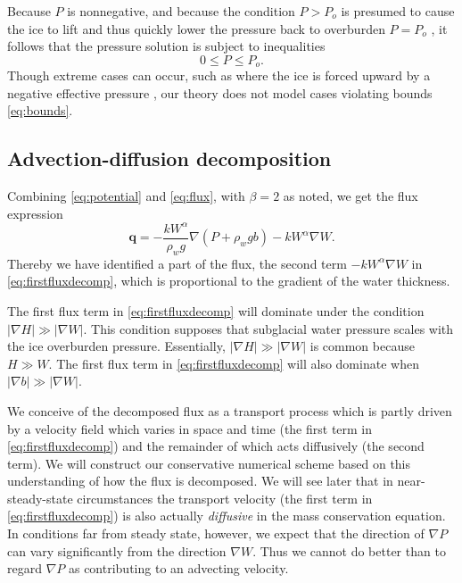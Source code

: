 \documentclass[11pt,final]{amsart}
\newcommand\bq{\mathbf{q}}
\newcommand{\grad}{\nabla}
\begin{document}
Because $P$ is nonnegative, and because the condition $P>P_o$ is presumed to cause the ice to lift and thus quickly lower the pressure back to overburden $P=P_o$ \citep{Schoofetal2012}, it follows that the pressure solution is subject to inequalities
\begin{equation}
0 \le P \le P_o. \label{eq:bounds}
\end{equation}
Though extreme cases can occur, such as where the ice is forced upward by a negative effective pressure \citep{Schoofetal2012}, our theory does not model cases violating bounds \eqref{eq:bounds}.

\subsection*{Advection-diffusion decomposition}  Combining \eqref{eq:potential} and \eqref{eq:flux}, with $\beta=2$ as noted, we get the flux expression
\begin{equation}
  \bq = - \frac{k W^\alpha}{\rho_w g} \grad \left(P + \rho_w g b\right) - k W^\alpha \grad W. \label{eq:firstfluxdecomp}
\end{equation}
Thereby we have identified a part of the flux, the second term $-k W^\alpha \grad W$ in \eqref{eq:firstfluxdecomp}, which is proportional to the gradient of the water thickness.

The first flux term in \eqref{eq:firstfluxdecomp} will dominate under the condition $|\grad H| \gg |\grad W|$.  This condition supposes that subglacial water pressure scales with the ice overburden pressure.  Essentially, $|\grad H| \gg |\grad W|$ is common because $H\gg W$.  The first flux term in \eqref{eq:firstfluxdecomp} will also dominate when $|\grad b| \gg |\grad W|$. 

We conceive of the decomposed flux as a transport process which is partly driven by a velocity field which varies in space and time (the first term in \eqref{eq:firstfluxdecomp}) and the remainder of which acts diffusively (the second term).  We will construct our conservative numerical scheme based on this understanding of how the flux is decomposed.  We will see later that in near-steady-state circumstances the transport velocity (the first term in \eqref{eq:firstfluxdecomp}) is also actually \emph{diffusive} in the mass conservation equation.  In conditions far from steady state, however, we expect that the direction of $\grad P$ can vary significantly from the direction $\grad W$.  Thus we cannot do better than to regard $\grad P$ as contributing to an advecting velocity.
\end{document}
